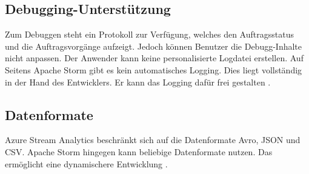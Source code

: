 \subsection{Debugging-Unterstützung} \label{Debugging}
Zum Debuggen steht ein Protokoll zur Verfügung, welches den Auftragsstatus und die Auftragsvorgänge aufzeigt. Jedoch können Benutzer die Debugg-Inhalte nicht anpassen. Der Anwender kann keine personalisierte Logdatei erstellen. Auf Seitens Apache Storm gibt es kein automatisches Logging. Dies liegt vollständig in der Hand des Entwicklers. Er kann das Logging dafür frei gestalten \cite{apachedebugging.2106}.

\subsection{Datenformate}
Azure Stream Analytics beschränkt sich auf die Datenformate Avro, JSON und CSV. Apache Storm hingegen kann beliebige Datenformate nutzen. Das ermöglicht eine dynamischere Entwicklung \cite{Klein.2017}. 

